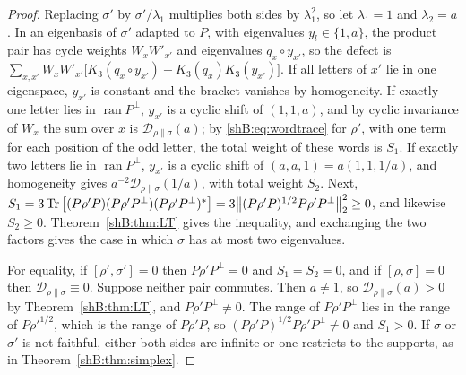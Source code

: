 \begin{proof}
Replacing $\sigma'$ by $\sigma'/\lambda_1$ multiplies both sides by $\lambda_1^2$, so let $\lambda_1=1$ and $\lambda_2=a$. In an eigenbasis of $\sigma'$ adapted to $P$, with eigenvalues $y_l\in\{1,a\}$, the product pair has cycle weights $W_xW'_{x'}$ and eigenvalues $q_x\circ y_{x'}$, so the defect is $\sum_{x,x'}W_xW'_{x'}\big[K_3(q_x\circ y_{x'})-K_3(q_x)K_3(y_{x'})\big]$. If all letters of $x'$ lie in one eigenspace, $y_{x'}$ is constant and the bracket vanishes by homogeneity. If exactly one letter lies in $\operatorname{ran}P^\perp$, $y_{x'}$ is a cyclic shift of $(1,1,a)$, and by cyclic invariance of $W_x$ the sum over $x$ is $\mathcal D_{\rho\|\sigma}(a)$; by \eqref{shB:eq:wordtrace} for $\rho'$, with one term for each position of the odd letter, the total weight of these words is $S_1$. If exactly two letters lie in $\operatorname{ran}P^\perp$, $y_{x'}$ is a cyclic shift of $(a,a,1)=a(1,1,1/a)$, and homogeneity gives $a^{-2}\mathcal D_{\rho\|\sigma}(1/a)$, with total weight $S_2$. Next, $S_1=3\operatorname{Tr}\big[(P\rho'P)(P\rho'P^\perp)(P\rho'P^\perp)^*\big]=3\big\|(P\rho'P)^{1/2}P\rho'P^\perp\big\|_2^2\ge0$, and likewise $S_2\ge0$. Theorem~\ref{shB:thm:LT} gives the inequality, and exchanging the two factors gives the case in which $\sigma$ has at most two eigenvalues.

For equality, if $[\rho',\sigma']=0$ then $P\rho'P^\perp=0$ and $S_1=S_2=0$, and if $[\rho,\sigma]=0$ then $\mathcal D_{\rho\|\sigma}\equiv0$. Suppose neither pair commutes. Then $a\ne1$, so $\mathcal D_{\rho\|\sigma}(a)>0$ by Theorem~\ref{shB:thm:LT}, and $P\rho'P^\perp\ne0$. The range of $P\rho'P^\perp$ lies in the range of $P\rho'^{1/2}$, which is the range of $P\rho'P$, so $(P\rho'P)^{1/2}P\rho'P^\perp\ne0$ and $S_1>0$. If $\sigma$ or $\sigma'$ is not faithful, either both sides are infinite or one restricts to the supports, as in Theorem~\ref{shB:thm:simplex}.
\end{proof}

